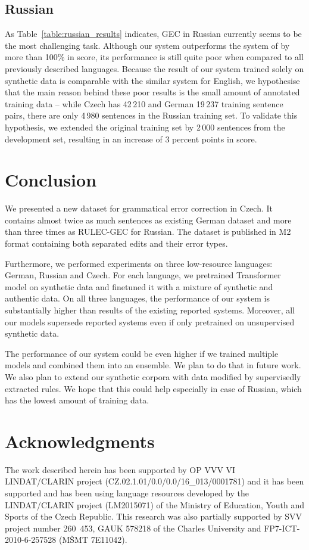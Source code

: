 \documentclass[11pt,a4paper]{article}
\begin{document}
\subsection{Russian}

As Table~\ref{table:russian_results} indicates, GEC in Russian currently seems to be the most challenging task. Although our system outperforms the system of  by more than 100\% in  score, its performance is still quite poor when compared to all previously described languages. Because the result of our system trained solely on synthetic data is comparable with the similar system for English, we hypothesise that the main reason behind these poor results is the small amount of annotated training data -- while Czech has 42\,210 and German 19\,237 training sentence pairs, there are only 4\,980 sentences in the Russian training set. To validate this hypothesis, we extended the original training set by 2\,000 sentences from the development set, resulting in an increase of 3 percent points in  score.

\section{Conclusion}

We presented a new dataset for grammatical error correction in Czech. It contains almost twice as much sentences as existing German dataset and more than three times as RULEC-GEC for Russian. The dataset is published in M2 format containing both separated edits and their error types.

Furthermore, we performed experiments on three low-resource languages: German, Russian and Czech. For each language, we pretrained Transformer model on synthetic data and finetuned it with a mixture of synthetic and authentic data. On all three languages, the performance of our system is substantially higher than results of the existing reported systems. Moreover, all our models supersede reported systems even if only pretrained on unsupervised synthetic data.

The performance of our system could be even higher if we trained multiple models and combined them into an ensemble. We plan to do that in future work. We also plan to extend our synthetic corpora with data modified by supervisedly extracted rules. We hope that this could help especially in case of Russian, which has the lowest amount of training data.

\section*{Acknowledgments}

The work described herein has been supported by OP VVV VI LINDAT/CLARIN project (CZ.02.1.01/0.0/0.0/16\_013/0001781) and it has been supported and has been using language resources developed by the LINDAT/CLARIN project (LM2015071) of the Ministry of Education, Youth and Sports of the Czech Republic. This research was also partially supported by SVV project number 260~453, GAUK 578218 of the Charles University and FP7-ICT-2010-6-257528 (MŠMT 7E11042).





\end{document}
